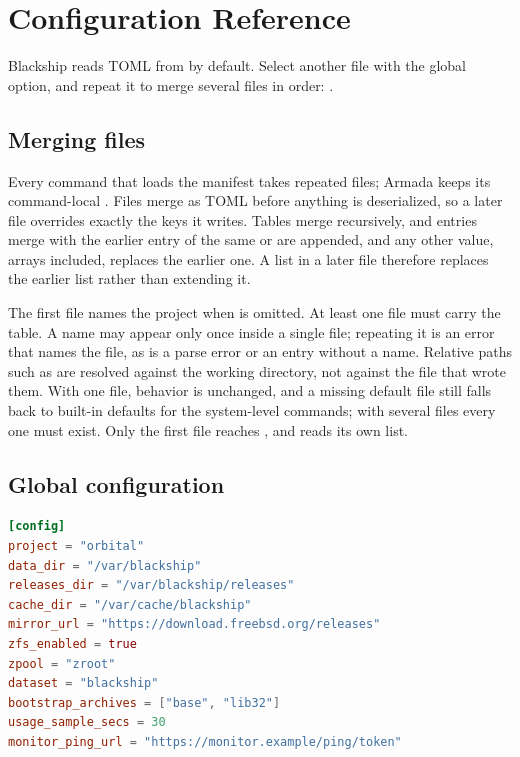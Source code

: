 \chapter{Configuration Reference}
\label{ch:configuration}

Blackship reads TOML from  by default. Select another file
with the global  option, and repeat it to merge several files
in order: .

\section{Merging files}

Every command that loads the manifest takes repeated  files; Armada
keeps its command-local . Files merge as TOML before anything is
deserialized, so a later file overrides exactly the keys it writes. Tables merge
recursively, \setting{[[jails]]} and \setting{[[networks]]} entries merge with
the earlier entry of the same  or are appended, and any other
value, arrays included, replaces the earlier one. A  list in a later
file therefore replaces the earlier list rather than extending it.

The first file names the project when  is omitted. At
least one file must carry the \setting{[config]} table. A name may appear only
once inside a single file; repeating it is an error that names the file, as is a
parse error or an entry without a name. Relative paths such as 
are resolved against the working directory, not against the file that wrote
them. With one file, behavior is unchanged, and a missing default file still
falls back to built-in defaults for the system-level commands; with several
files every one must exist. Only the first file reaches , and
 reads its own  list.

\section{Global configuration}

\begin{lstlisting}[language=TOML]
[config]
project = "orbital"
data_dir = "/var/blackship"
releases_dir = "/var/blackship/releases"
cache_dir = "/var/cache/blackship"
mirror_url = "https://download.freebsd.org/releases"
zfs_enabled = true
zpool = "zroot"
dataset = "blackship"
bootstrap_archives = ["base", "lib32"]
usage_sample_secs = 30
monitor_ping_url = "https://monitor.example/ping/token"
\end{lstlisting}

